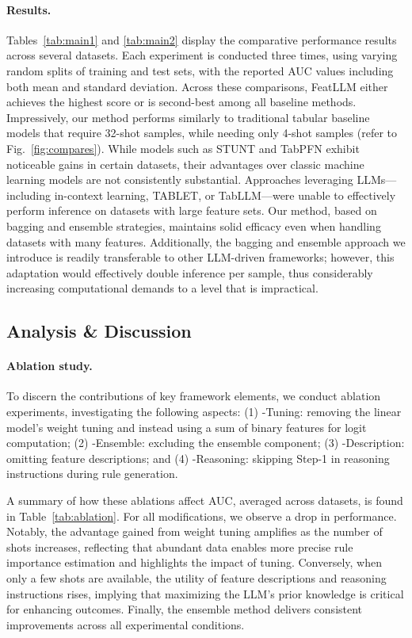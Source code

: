 \vspace*{-0.12in}
\paragraph{Results.}
Tables~\ref{tab:main1} and \ref{tab:main2} display the comparative performance results across several datasets. Each experiment is conducted three times, using varying random splits of training and test sets, with the reported AUC values including both mean and standard deviation. Across these comparisons, \textsf{FeatLLM} either achieves the highest score or is second-best among all baseline methods. Impressively, our method performs similarly to traditional tabular baseline models that require 32-shot samples, while needing only 4-shot samples (refer to Fig.~\ref{fig:compares}). While models such as STUNT and TabPFN exhibit noticeable gains in certain datasets, their advantages over classic machine learning models are not consistently substantial. Approaches leveraging LLMs—including in-context learning, TABLET, or TabLLM—were unable to effectively perform inference on datasets with large feature sets. Our method, based on bagging and ensemble strategies, maintains solid efficacy even when handling datasets with many features. Additionally, the bagging and ensemble approach we introduce is readily transferable to other LLM-driven frameworks; however, this adaptation would effectively double inference per sample, thus considerably increasing computational demands to a level that is impractical.

\subsection{Analysis \& Discussion}
\label{sec:analysis}
\paragraph{Ablation study.} To discern the contributions of key framework elements, we conduct ablation experiments, investigating the following aspects: (1) \textsf{-Tuning}: removing the linear model’s weight tuning and instead using a sum of binary features for logit computation; (2) \textsf{-Ensemble}: excluding the ensemble component; (3) \textsf{-Description}: omitting feature descriptions; and (4) \textsf{-Reasoning}: skipping Step-1 in reasoning instructions during rule generation.

A summary of how these ablations affect AUC, averaged across datasets, is found in Table~\ref{tab:ablation}. For all modifications, we observe a drop in performance. Notably, the advantage gained from weight tuning amplifies as the number of shots increases, reflecting that abundant data enables more precise rule importance estimation and highlights the impact of tuning. Conversely, when only a few shots are available, the utility of feature descriptions and reasoning instructions rises, implying that maximizing the LLM’s prior knowledge is critical for enhancing outcomes. Finally, the ensemble method delivers consistent improvements across all experimental conditions.

